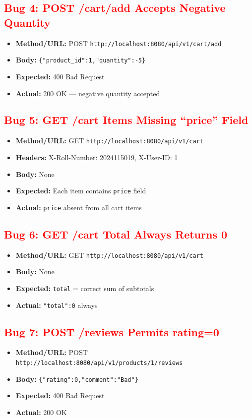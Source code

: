 \documentclass{article}
\begin{document}
\subsection*{\textcolor{red}{Bug 4: POST /cart/add Accepts Negative Quantity}}
\begin{itemize}[noitemsep]
  \item \textbf{Method/URL:} POST \texttt{http://localhost:8080/api/v1/cart/add}
  \item \textbf{Body:} \texttt{\{"product\_id":1,"quantity":-5\}}
  \item \textbf{Expected:} 400 Bad Request
  \item \textbf{Actual:} 200 OK — negative quantity accepted
\end{itemize}

\subsection*{\textcolor{red}{Bug 5: GET /cart Items Missing ``price'' Field}}
\begin{itemize}[noitemsep]
  \item \textbf{Method/URL:} GET \texttt{http://localhost:8080/api/v1/cart}
  \item \textbf{Headers:} X-Roll-Number: 2024115019, X-User-ID: 1
  \item \textbf{Body:} None
  \item \textbf{Expected:} Each item contains \texttt{price} field
  \item \textbf{Actual:} \texttt{price} absent from all cart items
\end{itemize}

\subsection*{\textcolor{red}{Bug 6: GET /cart Total Always Returns 0}}
\begin{itemize}[noitemsep]
  \item \textbf{Method/URL:} GET \texttt{http://localhost:8080/api/v1/cart}
  \item \textbf{Body:} None
  \item \textbf{Expected:} \texttt{total} = correct sum of subtotals
  \item \textbf{Actual:} \texttt{"total":0} always
\end{itemize}

\subsection*{\textcolor{red}{Bug 7: POST /reviews Permits rating=0}}
\begin{itemize}[noitemsep]
  \item \textbf{Method/URL:} POST \texttt{http://localhost:8080/api/v1/products/1/reviews}
  \item \textbf{Body:} \texttt{\{"rating":0,"comment":"Bad"\}}
  \item \textbf{Expected:} 400 Bad Request
  \item \textbf{Actual:} 200 OK
\end{itemize}
\end{document}
